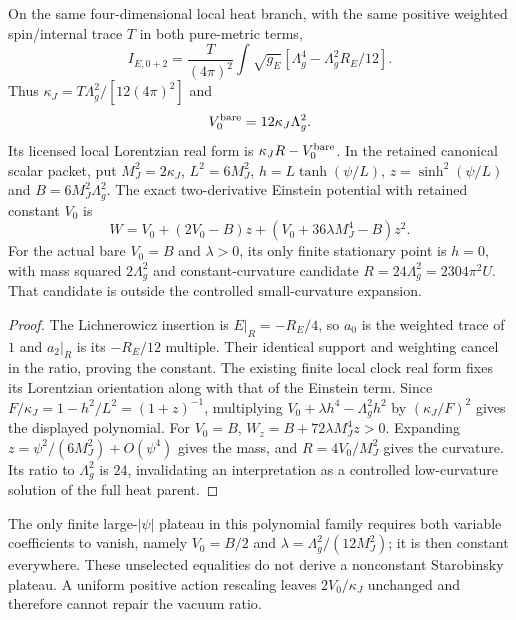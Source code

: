 \documentclass[11pt,a4paper]{article}
\begin{document}
\begin{proposition}
\label{p3f:prop:v2216-bare-heat-vacuum}
On the same four-dimensional local heat branch, with the same positive
weighted spin/internal trace $T$ in both pure-metric terms,
\[
 I_{E,0+2}=\frac{T}{(4\pi)^2}\int\sqrt{g_E}
 [\Lambda_g^4-\Lambda_g^2R_E/12].
\]
Thus $\kappa_J=T\Lambda_g^2/[12(4\pi)^2]$ and
\[
 V_0^{\rm bare}=12\kappa_J\Lambda_g^2.
\]
Its licensed local Lorentzian real form is
$\kappa_JR-V_0^{\rm bare}$.  In the retained canonical scalar packet,
put $M_J^2=2\kappa_J$, $L^2=6M_J^2$,
$h=L\tanh(\psi/L)$, $z=\sinh^2(\psi/L)$ and
$B=6M_J^2\Lambda_g^2$.  The exact two-derivative Einstein potential
with retained constant $V_0$ is
\[
 W=V_0+(2V_0-B)z+(V_0+36\lambda M_J^4-B)z^2.
\]
For the actual bare $V_0=B$ and $\lambda>0$, its only finite stationary
point is $h=0$, with mass squared $2\Lambda_g^2$ and constant-curvature
candidate $R=24\Lambda_g^2=2304\pi^2U$.
That candidate is outside the controlled small-curvature expansion.
\end{proposition}
\begin{proof}
The Lichnerowicz insertion is $E|_R=-R_E/4$, so $a_0$ is the
weighted trace of $1$ and $a_2|_R$ is its $-R_E/12$ multiple.
Their identical support and weighting cancel in the ratio, proving the
constant.  The existing finite local clock real form fixes its
Lorentzian orientation along with that of the Einstein term.
Since $F/\kappa_J=1-h^2/L^2=(1+z)^{-1}$, multiplying
$V_0+\lambda h^4-\Lambda_g^2h^2$ by $(\kappa_J/F)^2$ gives the
displayed polynomial.  For $V_0=B$,
$W_z=B+72\lambda M_J^4z>0$.  Expanding
$z=\psi^2/(6M_J^2)+O(\psi^4)$ gives the mass, and
$R=4V_0/M_J^2$ gives the curvature.  Its ratio to $\Lambda_g^2$ is
$24$, invalidating an interpretation as a controlled low-curvature
solution of the full heat parent.
\end{proof}
The only finite large-$|\psi|$ plateau in this polynomial family
requires both variable coefficients to vanish, namely
$V_0=B/2$ and $\lambda=\Lambda_g^2/(12M_J^2)$; it is then constant
everywhere.  These unselected equalities do not derive a nonconstant
Starobinsky plateau.  A uniform positive action rescaling leaves
$2V_0/\kappa_J$ unchanged and therefore cannot repair the vacuum ratio.
\end{document}
